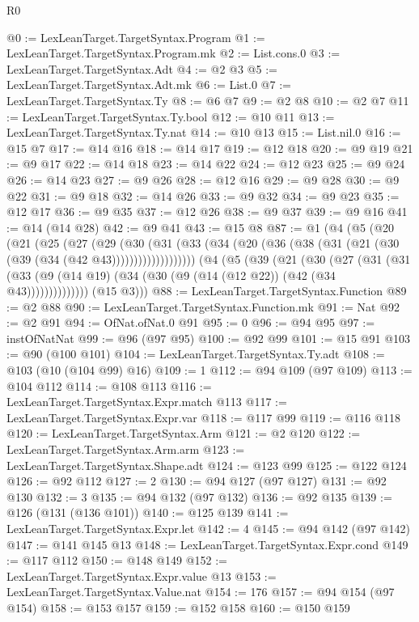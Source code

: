 \begin{lexlean}{R0}
\begin{coremodule}
@0 := LexLeanTarget.TargetSyntax.Program
@1 := LexLeanTarget.TargetSyntax.Program.mk
@2 := List.cons.{0}
@3 := LexLeanTarget.TargetSyntax.Adt
@4 := @2 @3
@5 := LexLeanTarget.TargetSyntax.Adt.mk
@6 := List.{0}
@7 := LexLeanTarget.TargetSyntax.Ty
@8 := @6 @7
@9 := @2 @8
@10 := @2 @7
@11 := LexLeanTarget.TargetSyntax.Ty.bool
@12 := @10 @11
@13 := LexLeanTarget.TargetSyntax.Ty.nat
@14 := @10 @13
@15 := List.nil.{0}
@16 := @15 @7
@17 := @14 @16
@18 := @14 @17
@19 := @12 @18
@20 := @9 @19
@21 := @9 @17
@22 := @14 @18
@23 := @14 @22
@24 := @12 @23
@25 := @9 @24
@26 := @14 @23
@27 := @9 @26
@28 := @12 @16
@29 := @9 @28
@30 := @9 @22
@31 := @9 @18
@32 := @14 @26
@33 := @9 @32
@34 := @9 @23
@35 := @12 @17
@36 := @9 @35
@37 := @12 @26
@38 := @9 @37
@39 := @9 @16
@41 := @14 (@14 @28)
@42 := @9 @41
@43 := @15 @8
@87 := @1
    (@4
      (@5
        (@20
          (@21
            (@25
              (@27
                (@29
                  (@30
                    (@31
                      (@33 (@34 (@20 (@36 (@38 (@31 (@21 (@30 (@39 (@34 (@42 @43)))))))))))))))))))
      (@4
        (@5
          (@39
            (@21
              (@30
                (@27
                  (@31
                    (@31
                      (@33 (@9 (@14 @19) (@34 (@30 (@9 (@14 (@12 @22)) (@42 (@34 @43))))))))))))))
        (@15 @3)))
@88 := LexLeanTarget.TargetSyntax.Function
@89 := @2 @88
@90 := LexLeanTarget.TargetSyntax.Function.mk
@91 := Nat
@92 := @2 @91
@94 := OfNat.ofNat.{0} @91
@95 := 0
@96 := @94 @95
@97 := instOfNatNat
@99 := @96 (@97 @95)
@100 := @92 @99
@101 := @15 @91
@103 := @90 (@100 @101)
@104 := LexLeanTarget.TargetSyntax.Ty.adt
@108 := @103 (@10 (@104 @99) @16)
@109 := 1
@112 := @94 @109 (@97 @109)
@113 := @104 @112
@114 := @108 @113
@116 := LexLeanTarget.TargetSyntax.Expr.match @113
@117 := LexLeanTarget.TargetSyntax.Expr.var
@118 := @117 @99
@119 := @116 @118
@120 := LexLeanTarget.TargetSyntax.Arm
@121 := @2 @120
@122 := LexLeanTarget.TargetSyntax.Arm.arm
@123 := LexLeanTarget.TargetSyntax.Shape.adt
@124 := @123 @99
@125 := @122 @124
@126 := @92 @112
@127 := 2
@130 := @94 @127 (@97 @127)
@131 := @92 @130
@132 := 3
@135 := @94 @132 (@97 @132)
@136 := @92 @135
@139 := @126 (@131 (@136 @101))
@140 := @125 @139
@141 := LexLeanTarget.TargetSyntax.Expr.let
@142 := 4
@145 := @94 @142 (@97 @142)
@147 := @141 @145 @13
@148 := LexLeanTarget.TargetSyntax.Expr.cond
@149 := @117 @112
@150 := @148 @149
@152 := LexLeanTarget.TargetSyntax.Expr.value @13
@153 := LexLeanTarget.TargetSyntax.Value.nat
@154 := 176
@157 := @94 @154 (@97 @154)
@158 := @153 @157
@159 := @152 @158
@160 := @150 @159

\end{coremodule}
\end{lexlean}
